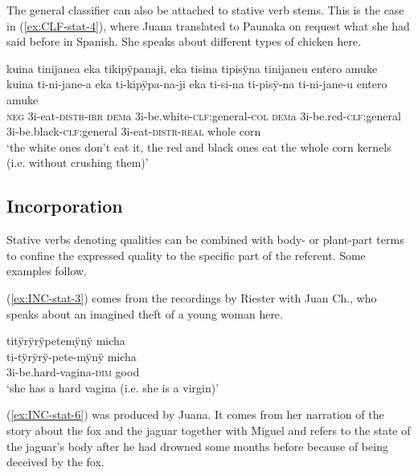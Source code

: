The general classifier can also be attached to stative verb stems. This is the case in (\ref{ex:CLF-stat-4}), where Juana translated to Paunaka on request what she had said before in Spanish. She speaks about different types of chicken here.

\ea\label{ex:CLF-stat-4}
\begingl
\glpreamble kuina tinijanea eka tikipÿpanaji, eka tisina tipisÿna tinijaneu entero amuke\\
\gla kuina ti-ni-jane-a eka ti-kipÿpa-na-ji eka ti-si-na ti-pisÿ-na ti-ni-jane-u entero amuke\\
\glb \textsc{neg} 3i-eat-\textsc{distr}-\textsc{irr} \textsc{dem}a 3i-be.white-\textsc{clf:}general-\textsc{col} \textsc{dem}a 3i-be.red-\textsc{clf:}general 3i-be.black-\textsc{clf:}general 3i-eat-\textsc{distr}-\textsc{real} whole corn\\
\glft ‘the white ones don’t eat it, the red and black ones eat the whole corn kernels (i.e. without crushing them)’
\endgl
\trailingcitation{[jxx-e150925l-1.143-144]}
\xe





\subsection{Incorporation}\label{sec:StativeVerbs_INC}

Stative verbs denoting qualities can be combined with body- or plant-part terms to confine the expressed quality to the specific part of the referent. Some examples follow.

(\ref{ex:INC-stat-3}) comes from the recordings by Riester with Juan Ch., who speaks about an imagined theft of a young woman here.

\ea\label{ex:INC-stat-3}
\begingl
\glpreamble titÿrÿrÿpetemÿnÿ micha\\
\gla ti-tÿrÿrÿ-pete-mÿnÿ micha\\
\glb 3i-be.hard-vagina-\textsc{dim} good\\
\glft ‘she has a hard vagina (i.e. she is a virgin)’
\endgl
\trailingcitation{[nxx-a630101g-3.023]}
\xe

(\ref{ex:INC-stat-6}) was produced by Juana. It comes from her narration of the story about the fox and the jaguar together with Miguel and refers to the state of the jaguar’s body after he had drowned some months before because of being deceived by the fox. 

